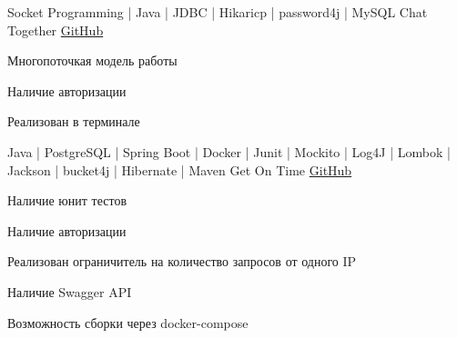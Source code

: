 \begin{cventries}
  \cventry
    {Socket Programming | Java | JDBC | Hikaricp | password4j | MySQL} %
    {Chat Together} %
    {\href{https://github.com/MasoNord/chat-together}{GitHub}} %
    {} %
    {
      \begin{cvitems} %
        \item {Многопоточкая модель работы}
        \item {Наличие авторизации}
        \item {Реализован в терминале}
      \end{cvitems}
    }
    \cventry
      {Java | PostgreSQL | Spring Boot | Docker | Junit | Mockito | Log4J | Lombok | Jackson | bucket4j | Hibernate | Maven} %
      {Get On Time} %
      {\href{https://github.com/MasoNord/Get-On-Time}{GitHub}} %
      {} %
      {
        \begin{cvitems} %
          \item {Наличие юнит тестов}
          \item {Наличие авторизации}
          \item {Реализован ограничитель на количество запросов от одного IP}
          \item {Наличие Swagger API}
          \item {Возможность сборки через docker-compose}
        \end{cvitems}
      }
\end{cventries}
